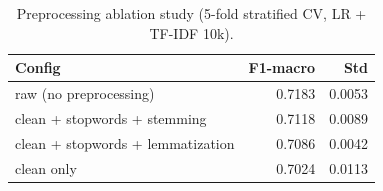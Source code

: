\begin{table}
\caption{Preprocessing ablation study (5-fold stratified CV, LR + TF-IDF 10k).}
\label{tab:preproc}
\begin{tabular}{lrr}
\toprule
Config & F1-macro & Std \\
\midrule
raw (no preprocessing) & 0.7183 & 0.0053 \\
clean + stopwords + stemming & 0.7118 & 0.0089 \\
clean + stopwords + lemmatization & 0.7086 & 0.0042 \\
clean only & 0.7024 & 0.0113 \\
\bottomrule
\end{tabular}
\end{table}
